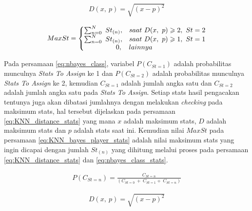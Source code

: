 \begin{equation}\label{eq:KNN_distance_stats}
\begin{split}
D(x,\ p) = \sqrt{(x - p)^2}
\end{split}
\end{equation}

\begin{equation}\label{eq:KNN_bayes_player_stats}
\begin{split}
MaxSt = \left\{\begin{matrix}
\sum_{n = 0}^{N}\ St_{(n)}, & saat\ D(x,\ p) \geqslant 2,\ St = 2 \\ 
\sum_{n = 0}^{N}\ St_{(n)}, & saat\ D(x,\ p) \geqslant 1,\ St = 1 \\
\hspace{4.5em} 0, 			& \hspace{-7.8em} lainnya
\end{matrix}\right.
\end{split}
\end{equation}

Pada persamaan \ref{eq:nbayes_class}, variabel $P(C_{St = 1})$ adalah probabilitas munculnya \textit{Stats To Assign} ke 1 dan $P(C_{St = 2})$ adalah probabilitas munculnya \textit{Stats To Assign} ke 2, kemudian $C_{St = 1}$ adalah jumlah angka satu dan $C_{St = 2}$ adalah jumlah angka satu pada \textit{Stats To Assign}. Setiap stats hasil pengacakan tentunya juga akan dibatasi jumlahnya dengan melakukan \textit{checking} pada maksimum stats, hal tersebut dijelaskan pada persamaan \ref{eq:KNN_distance_stats} yang mana $x$ adalah maksimum stats, $D$ adalah maksimum stats dan $p$ adalah stats saat ini. Kemudian nilai $MaxSt$ pada persamaan \ref{eq:KNN_bayes_player_stats} adalah nilai maksimum stats yang ingin dicapai dengan jumlah $St_{(n)}$ yang dihitung melalui proses pada persamaan \ref{eq:KNN_distance_stats} dan \ref{eq:nbayes_class_stats}.

\begin{equation}\label{eq:nbayes_class_stats_1}
\begin{split}
P(C_{St = n}) = \frac{C_{St = n}}{(C_{St = 0}\ +\ C_{St = 1} +\ C_{St = n})}
\end{split}
\end{equation}

\begin{equation}\label{eq:KNN_distance_stats_1}
\begin{split}
D(x,\ p) = \sqrt{(x - p)^2}
\end{split}
\end{equation}

